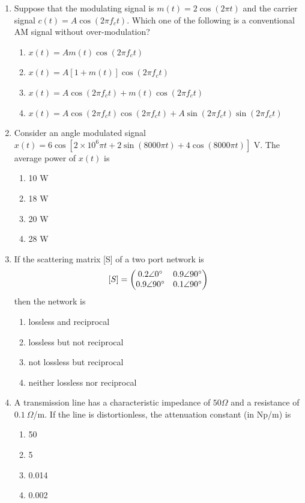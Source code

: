\documentclass[journal,12pt,onecolumn]{IEEEtran}
\begin{document}
\begin{enumerate}
\item Suppose that the modulating signal is $m(t)=2\cos(2\pi t)$ and the carrier signal $c(t)=A\cos(2\pi f_ct)$. Which one of the following is a conventional AM signal without over-modulation?
\begin{multicols}{2}
\begin{enumerate}
\item $x(t)=A m(t)\cos(2\pi f_c t)$
\item $x(t)=A[1+m(t)]\cos(2\pi f_c t)$
\item $x(t)=A\cos(2\pi f_ct)+m(t)\cos(2\pi f_ct)$
\item $x(t)=A\cos(2\pi f_ct)\cos(2\pi f_ct)+A\sin(2\pi f_ct)\sin(2\pi f_ct)$
\end{enumerate}
\end{multicols}

\item Consider an angle modulated signal $x(t)=6\cos[2\times 10^6\pi t+2\sin(8000\pi t)+4\cos(8000\pi t)]$ V. The average power of $x(t)$ is
\begin{multicols}{2}
\begin{enumerate}
\item 10 W
\item 18 W
\item 20 W
\item 28 W
\end{enumerate}
\end{multicols}

\item If the scattering matrix [S] of a two port network is
$$
[S]=\begin{pmatrix}0.2\angle 0^\circ & 0.9\angle 90^\circ\\ 0.9\angle 90^\circ & 0.1\angle 90^\circ\end{pmatrix}
$$
then the network is
\begin{multicols}{2}
\begin{enumerate}
\item lossless and reciprocal
\item lossless but not reciprocal
\item not lossless but reciprocal
\item neither lossless nor reciprocal
\end{enumerate}
\end{multicols}

\item A transmission line has a characteristic impedance of $50\Omega$ and a resistance of $0.1\ \Omega$/m. If the line is distortionless, the attenuation constant (in Np/m) is
\begin{multicols}{2}
\begin{enumerate}
\item 50
\item 5
\item 0.014
\item 0.002
\end{enumerate}
\end{multicols}


\end{enumerate}
\end{document}
